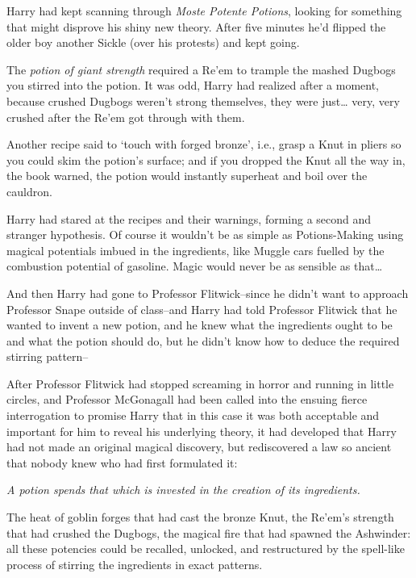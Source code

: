 Harry had kept scanning through \emph{Moste Potente Potions}, looking for something that might disprove his shiny new theory. After five minutes he'd flipped the older boy another Sickle (over his protests) and kept going.

The \emph{potion of giant strength} required a Re'em to trample the mashed Dugbogs you stirred into the potion. It was odd, Harry had realized after a moment, because crushed Dugbogs weren't strong themselves, they were just{\ldots} very, very crushed after the Re'em got through with them.

Another recipe said to `touch with forged bronze', i.e., grasp a Knut in pliers so you could skim the potion's surface; and if you dropped the Knut all the way in, the book warned, the potion would instantly superheat and boil over the cauldron.

Harry had stared at the recipes and their warnings, forming a second and stranger hypothesis. Of course it wouldn't be as simple as Potions-Making using magical potentials imbued in the ingredients, like Muggle cars fuelled by the combustion potential of gasoline. Magic would never be as sensible as that{\ldots}

And then Harry had gone to Professor Flitwick\---since he didn't want to approach Professor Snape outside of class\---and Harry had told Professor Flitwick that he wanted to invent a new potion, and he knew what the ingredients ought to be and what the potion should do, but he didn't know how to deduce the required stirring pattern\---

After Professor Flitwick had stopped screaming in horror and running in little circles, and Professor McGonagall had been called into the ensuing fierce interrogation to promise Harry that in this case it was both acceptable and important for him to reveal his underlying theory, it had developed that Harry had not made an original magical discovery, but rediscovered a law so ancient that nobody knew who had first formulated it:

\emph{A potion spends that which is invested in the creation of its ingredients.}

The heat of goblin forges that had cast the bronze Knut, the Re'em's strength that had crushed the Dugbogs, the magical fire that had spawned the Ashwinder: all these potencies could be recalled, unlocked, and restructured by the spell-like process of stirring the ingredients in exact patterns.


